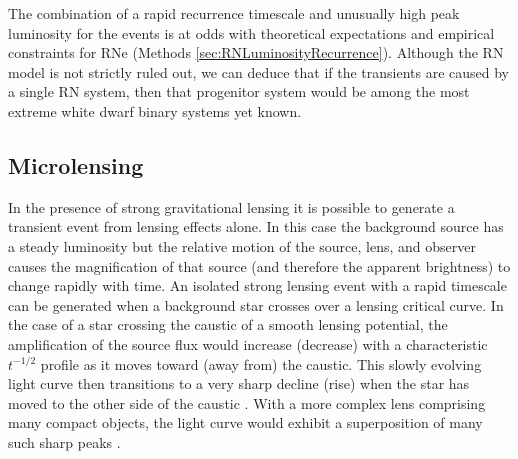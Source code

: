 The combination of a rapid recurrence timescale and unusually high
peak luminosity for the \spock events is at odds with theoretical
expectations and empirical constraints for RNe (Methods
\ref{sec:RNLuminosityRecurrence}). Although the RN model is not
strictly ruled out, we can deduce that if the \spock transients are
caused by a single RN system, then that progenitor system would be
among the most extreme white dwarf binary systems yet known.




\subsection{Microlensing}\label{sec:MicroLensing}

In the presence of strong gravitational lensing it is possible to
generate a transient event from lensing effects alone.  In this case
the background source has a steady luminosity but the relative motion
of the source, lens, and observer causes the magnification of that
source (and therefore the apparent brightness) to change rapidly with
time.  An isolated strong lensing event with a rapid timescale can be
generated when a background star crosses over a lensing critical
curve.  In the case of a star crossing the caustic of a smooth lensing
potential, the amplification of the source flux would increase
(decrease) with a characteristic $t^{-1/2}$ profile as it moves toward
(away from) the caustic. This slowly evolving light curve then
transitions to a very sharp decline (rise) when the star has moved to
the other side of the caustic \citep{Schneider:1986,
  MiraldaEscude:1991}.  With a more complex lens comprising many
compact objects, the light curve would exhibit a superposition of many
such sharp peaks \citep{Lewis:1993}.

